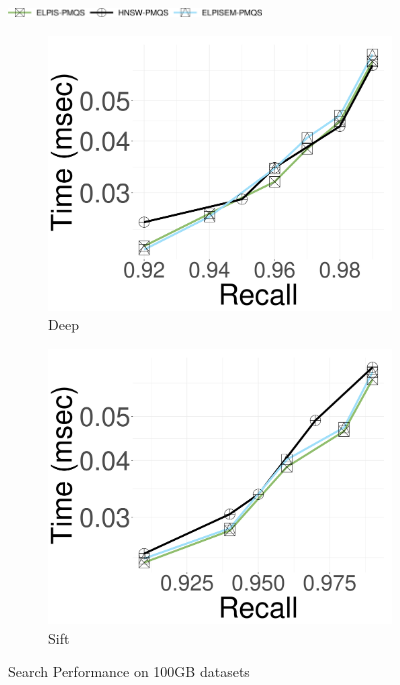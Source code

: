  \begin{figure}[!htb]
				\captionsetup{justification=centering}
  \includegraphics[width=0.6\textwidth]{../img/elpis2/EM/legendem.png}
		\captionsetup[subfigure]{justification=centering}
  	\centering
   
		\begin{subfigure}{0.3\textwidth}
			\includegraphics[width=\textwidth]{../img/elpis2/EM/100GB/deep_Time.png}
			\caption{Deep}  
		\label{fig:elpisem:query:performance:100GB:deep:10NN}
		\end{subfigure}
  \hspace{0.4cm}
		\begin{subfigure}{0.3\textwidth}
			\includegraphics[width=\textwidth]{../img/elpis2/EM/100GB/sift_Time.png}
			\caption{Sift}  
		\label{fig:elpisem:query:performance:100GB:sift:10NN}
		\end{subfigure}
		\caption{{Search Performance on 100GB datasets}}	
		\label{fig:elpisem:query:performance:100GB}
	\end{figure}
 
